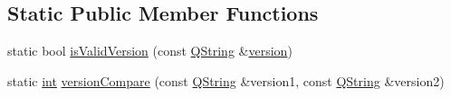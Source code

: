 \subsection*{Static Public Member Functions}
\begin{DoxyCompactItemize}
\item 
static bool \hyperlink{class_extension_system_1_1_internal_1_1_plugin_spec_private_a7233cda395b9d7ee44734541958ee82c}{is\-Valid\-Version} (const \hyperlink{group___u_a_v_objects_plugin_gab9d252f49c333c94a72f97ce3105a32d}{Q\-String} \&\hyperlink{class_extension_system_1_1_internal_1_1_plugin_spec_private_a00cf7a310301d427a56b1b23576289bc}{version})
\item 
static \hyperlink{ioapi_8h_a787fa3cf048117ba7123753c1e74fcd6}{int} \hyperlink{class_extension_system_1_1_internal_1_1_plugin_spec_private_a9b2b47f08743b4cb4dc977755390959a}{version\-Compare} (const \hyperlink{group___u_a_v_objects_plugin_gab9d252f49c333c94a72f97ce3105a32d}{Q\-String} \&version1, const \hyperlink{group___u_a_v_objects_plugin_gab9d252f49c333c94a72f97ce3105a32d}{Q\-String} \&version2)
\end{DoxyCompactItemize}
